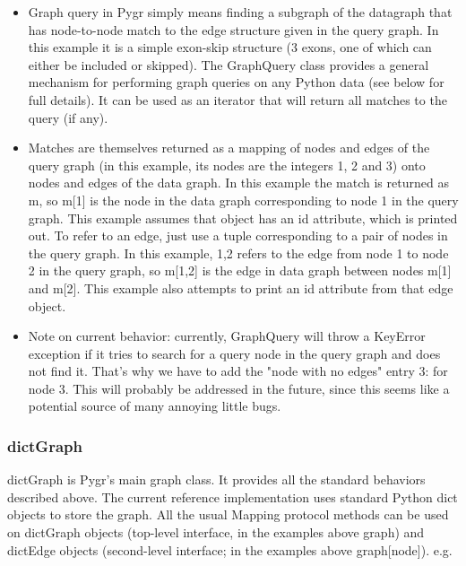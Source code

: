 \documentclass{howto}
\begin{document}
\begin{itemize}
\item         
Graph query in Pygr simply means finding a subgraph of the datagraph that has node-to-node match to the edge structure given in the query graph.  In this example it is a simple exon-skip structure (3 exons, one of which can either be included or skipped).  The GraphQuery class provides a general mechanism for performing graph queries on any Python data (see below for full details).  It can be used as an iterator that will return all matches to the query (if any). 

\item          
Matches are themselves returned as a mapping of nodes and edges of the query graph (in this example, its nodes are the integers 1, 2 and 3) onto nodes and edges of the data graph.  In this example the match is returned as m, so m[1] is the node in the data graph corresponding to node 1 in the query graph.  This example assumes that object has an id attribute, which is printed out.  To refer to an edge, just use a tuple corresponding to a pair of nodes in the query graph.  In this example, 1,2 refers to the edge from node 1 to node 2 in the query graph, so m[1,2] is the edge in data graph between nodes m[1] and m[2].  This example also attempts to print an id attribute from that edge object.

\item         
Note on current behavior: currently, GraphQuery will throw a KeyError exception if it tries to search for a query node in the query graph and does not find it.  That's why we have to add the "node with no edges" entry 3:{} for node 3.  This will probably be addressed in the future, since this seems like a potential source of many annoying little bugs.

\end{itemize}

\subsubsection{dictGraph}

dictGraph is Pygr's main graph class.  It provides all the standard behaviors described above.  The current reference implementation uses standard Python dict objects to store the graph.  All the usual Mapping protocol methods can be used on dictGraph objects (top-level interface, in the examples above graph) and dictEdge objects (second-level interface; in the examples above graph[node]). e.g.
\end{document}
